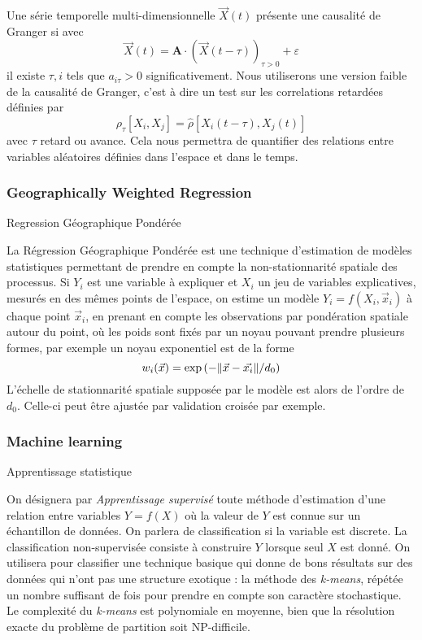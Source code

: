 Une série temporelle multi-dimensionnelle $\vec{X}(t)$ présente une causalité de Granger si avec
\[
\vec{X}(t) = \mathbf{A}\cdot \left(\vec{X}(t-\tau)\right)_{\tau >0} + \varepsilon
\]
il existe $\tau,i$ tels que $a_{i\tau}>0$ significativement. Nous utiliserons une version faible de la causalité de Granger, c'est à dire un test sur les correlations retardées définies par
\[
\rho_{\tau}\left[X_i,X_j\right] = \hat{\rho}\left[X_i(t-\tau),X_j(t)\right]
\]
avec $\tau$ retard ou avance. Cela nous permettra de quantifier des relations entre variables aléatoires définies dans l'espace et dans le temps.



\subsubsection*{Geographically Weighted Regression}{Regression Géographique Pondérée}


La Régression Géographique Pondérée est une technique d'estimation de modèles statistiques permettant de prendre en compte la non-stationnarité spatiale des processus. Si $Y_i$ est une variable à expliquer et $X_i$ un jeu de variables explicatives, mesurés en des mêmes points de l'espace, on estime un modèle $Y_i = f(X_i,\vec{x}_i)$ à chaque point $\vec{x}_i$, en prenant en compte les observations par pondération spatiale autour du point, où les poids sont fixés par un noyau pouvant prendre plusieurs formes, par exemple un noyau exponentiel est de la forme
\[
w_i(\vec{x}) = \exp\left(- \| \vec{x} - \vec{x_i} \| / d_0\right)
\]
L'échelle de stationnarité spatiale supposée par le modèle est alors de l'ordre de $d_0$. Celle-ci peut être ajustée par validation croisée par exemple.




\subsubsection*{Machine learning}{Apprentissage statistique}


On désignera par \emph{Apprentissage supervisé} toute méthode d'estimation d'une relation entre variables $Y=f(X)$ où la valeur de $Y$ est connue sur un échantillon de données. On parlera de classification si la variable est discrete. La classification non-supervisée consiste à construire $Y$ lorsque seul $X$ est donné. On utilisera pour classifier une technique basique qui donne de bons résultats sur des données qui n'ont pas une structure exotique : la méthode des \emph{k-means}, répétée un nombre suffisant de fois pour prendre en compte son caractère stochastique. Le complexité du \emph{k-means} est polynomiale en moyenne, bien que la résolution exacte du problème de partition soit NP-difficile.




